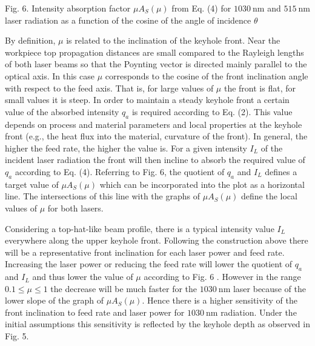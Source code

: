 \documentclass[10pt]{article}
\begin{document}
Fig. 6. Intensity absorption factor $\mu A_{S}(\mu)$ from Eq. (4) for $1030 \mathrm{~nm}$ and $515 \mathrm{~nm}$ laser radiation as a function of the cosine of the angle of incidence $\theta$

By definition, $\mu$ is related to the inclination of the keyhole front. Near the workpiece top propagation distances are small compared to the Rayleigh lengths of both laser beams so that the Poynting vector is directed mainly parallel to the optical axis. In this case $\mu$ corresponds to the cosine of the front inclination angle with respect to the feed axis. That is, for large values of $\mu$ the front is flat, for small values it is steep. In order to maintain a steady keyhole front a certain value of the absorbed intensity $q_{a}$ is required according to Eq. (2). This value depends on process and material parameters and local properties at the keyhole front (e.g., the heat flux into the material, curvature of the front). In general, the higher the feed rate, the higher the value is. For a given intensity $I_{L}$ of the incident laser radiation the front will then incline to absorb the required value of $q_{a}$ according to Eq. (4). Referring to Fig. 6, the quotient of $q_{a}$ and $I_{L}$ defines a target value of $\mu A_{S}(\mu)$ which can be incorporated into the plot as a horizontal line. The intersections of this line with the graphs of $\mu A_{S}(\mu)$ define the local values of $\mu$ for both lasers.

Considering a top-hat-like beam profile, there is a typical intensity value $I_{L}$ everywhere along the upper keyhole front. Following the construction above there will be a representative front inclination for each laser power and feed rate. Increasing the laser power or reducing the feed rate will lower the quotient of $q_{a}$ and $I_{L}$ and thus lower the value of $\mu$ according to Fig. 6 . However in the range $0.1 \leq \mu \leq 1$ the decrease will be much faster for the $1030 \mathrm{~nm}$ laser because of the lower slope of the graph of $\mu A_{S}(\mu)$. Hence there is a higher sensitivity of the front inclination to feed rate and laser power for $1030 \mathrm{~nm}$ radiation. Under the initial assumptions this sensitivity is reflected by the keyhole depth as observed in Fig. 5.
\end{document}
